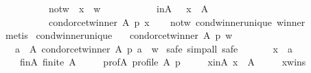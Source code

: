 \begin{isabellebody}
\ \ \ \ \ \ \ \ \ \ not{\isacharunderscore}{\kern0pt}w{\isacharcolon}{\kern0pt}\ \ {\isachardoublequoteopen}x\ {\isasymnoteq}\ w{\isachardoublequoteclose}\ \isanewline
\ \ \ \ \ \ \ \ \ \ in{\isacharunderscore}{\kern0pt}A{\isacharcolon}{\kern0pt}\ \ \ {\isachardoublequoteopen}x\ {\isasymin}\ A{\isachardoublequoteclose}\isanewline
\ \ \ \ \ \ \ \ \ {\isachardoublequoteopen}{\isasymnot}\ condorcet{\isacharunderscore}{\kern0pt}winner\ A\ p\ x{\isachardoublequoteclose}\isanewline
%
\isadelimproof
\ \ %
\endisadelimproof
%
\isatagproof
{}\isamarkupfalse%
\ not{\isacharunderscore}{\kern0pt}w\ cond{\isacharunderscore}{\kern0pt}winner{\isacharunderscore}{\kern0pt}unique\ winner\isanewline
\ \ \isamarkupfalse%
\ metis%
\endisatagproof
{\isafoldproof}%
%
\isadelimproof
\isanewline
%
\endisadelimproof
\isanewline
{}\isamarkupfalse%
\ cond{\isacharunderscore}{\kern0pt}winner{\isacharunderscore}{\kern0pt}unique{}{\isacharcolon}{\kern0pt}\isanewline
\ \ \ {\isachardoublequoteopen}condorcet{\isacharunderscore}{\kern0pt}winner\ A\ p\ w{\isachardoublequoteclose}\isanewline
\ \ \ {\isachardoublequoteopen}{\isacharbraceleft}{\kern0pt}a\ {\isasymin}\ A{\isachardot}{\kern0pt}\ condorcet{\isacharunderscore}{\kern0pt}winner\ A\ p\ a{\isacharbraceright}{\kern0pt}\ {\isacharequal}{\kern0pt}\ {\isacharbraceleft}{\kern0pt}w{\isacharbraceright}{\kern0pt}{\isachardoublequoteclose}\isanewline
%
\isadelimproof
%
\endisadelimproof
%
\isatagproof
{}\isamarkupfalse%
\ {\isacharparenleft}{\kern0pt}safe{\isacharcomma}{\kern0pt}\ simp{\isacharunderscore}{\kern0pt}all{\isacharcomma}{\kern0pt}\ safe{\isacharparenright}{\kern0pt}\isanewline
\ \ \isamarkupfalse%
\isanewline
\ \ \ \ x\ {\isacharcolon}{\kern0pt}{\isacharcolon}{\kern0pt}\ {\isachardoublequoteopen}{\isacharprime}{\kern0pt}a{\isachardoublequoteclose}\isanewline
\ \ \isamarkupfalse%
\isanewline
\ \ \ \ fin{\isacharunderscore}{\kern0pt}A{\isacharcolon}{\kern0pt}\ {\isachardoublequoteopen}finite\ A{\isachardoublequoteclose}\ \isanewline
\ \ \ \ prof{\isacharunderscore}{\kern0pt}A{\isacharcolon}{\kern0pt}\ {\isachardoublequoteopen}profile\ A\ p{\isachardoublequoteclose}\ \isanewline
\ \ \ \ x{\isacharunderscore}{\kern0pt}in{\isacharunderscore}{\kern0pt}A{\isacharcolon}{\kern0pt}\ {\isachardoublequoteopen}x\ {\isasymin}\ A{\isachardoublequoteclose}\ \isanewline
\ \ \ \ x{\isacharunderscore}{\kern0pt}wins{\isacharcolon}{\kern0pt}\isanewline

\end{isabellebody}

